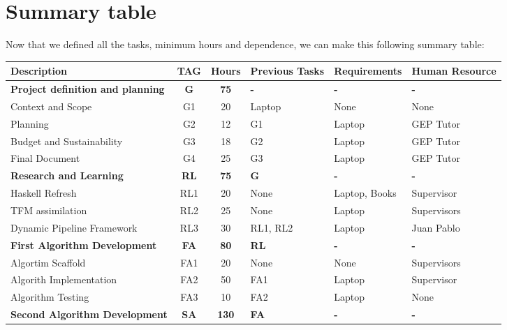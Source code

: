 \section{Summary table}
Now that we defined all the tasks, minimum hours and dependence, we can make this following summary table:
\begin{table}[H]
    \begin{adjustwidth}{-1in}{-1in}
    \centering
    \begin{tabular}{|p{5cm}|c|c|p{2cm}|p{3cm}|p{3cm}|}
    \hline
    \textbf{Description} & \textbf{TAG} & \textbf{Hours} & \textbf{Previous Tasks} & \textbf{Requirements} & \textbf{Human Resource} \\
    \hline
    \hline	
    \rowcolor{LightGray}
    \textbf{Project definition and planning} & \textbf{G} & \textbf{75} & \textbf{-} & \textbf{-} & \textbf{-}  \\
    \hline
    Context and Scope & G1 & 20 & Laptop & None & None \\
    \hline
    Planning & G2 & 12 & G1 & Laptop & GEP Tutor \\
    \hline
    Budget and Sustainability & G3 & 18 & G2 & Laptop & GEP Tutor \\
    \hline
    Final Document & G4 & 25 & G3 & Laptop & GEP Tutor \\
    \hline
    \hline
    \rowcolor{LightGray}
    \textbf{Research and Learning} & \textbf{RL} & \textbf{75} & \textbf{G} & \textbf{-} & \textbf{-} \\
    \hline
    Haskell Refresh & RL1 & 20 & None & Laptop, Books & Supervisor \\
    \hline
    TFM assimilation & RL2 & 25 & None & Laptop & Supervisors \\
    \hline
    Dynamic Pipeline Framework & RL3 & 30 & RL1, RL2 & Laptop & Juan Pablo \\
    \hline
    \hline
    \rowcolor{LightGray}
    \textbf{First Algorithm Development} & \textbf{FA} & \textbf{80} & \textbf{RL} & \textbf{-} & \textbf{-} \\
    \hline
    Algortim Scaffold & FA1 & 20 & None & None & Supervisors\\
    \hline
    Algorith Implementation & FA2 & 50 & FA1 & Laptop & Supervisor\\
    \hline
    Algorithm Testing & FA3 & 10 & FA2 & Laptop & None \\
    \hline
    \hline
    \rowcolor{LightGray}
    \textbf{Second Algorithm Development} & \textbf{SA} & \textbf{130} & \textbf{FA} & \textbf{-} & \textbf{-} \\

\end{tabular}
\end{adjustwidth}
\end{table}
